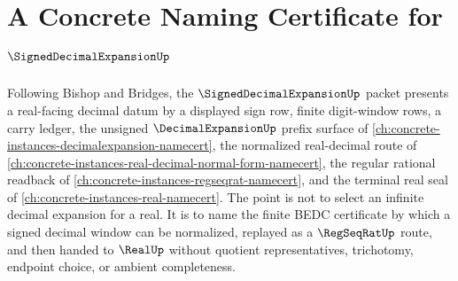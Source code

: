 \chapter{A Concrete Naming Certificate for $\SignedDecimalExpansionUp$}
\label{ch:concrete-instances-signed-decimal-expansion-namecert}

Following Bishop and Bridges, the $\SignedDecimalExpansionUp$ packet presents a real-facing decimal datum by a displayed sign row, finite digit-window rows, a carry ledger, the unsigned $\DecimalExpansionUp$ prefix surface of \autoref{ch:concrete-instances-decimalexpansion-namecert}, the normalized real-decimal route of \autoref{ch:concrete-instances-real-decimal-normal-form-namecert}, the regular rational readback of \autoref{ch:concrete-instances-regseqrat-namecert}, and the terminal real seal of \autoref{ch:concrete-instances-real-namecert}. The point is not to select an infinite decimal expansion for a real. It is to name the finite BEDC certificate by which a signed decimal window can be normalized, replayed as a $\RegSeqRatUp$ route, and then handed to $\RealUp$ without quotient representatives, trichotomy, endpoint choice, or ambient completeness.

